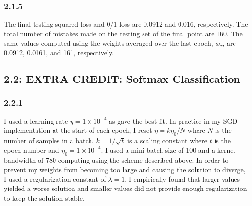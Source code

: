 \documentclass[12pt]{amsart}
\begin{document}
\subsubsection*{2.1.5}
The final testing squared loss and 0/1 loss are 0.0912 and 0.016, respectively.  The total number of mistakes made on the testing set of the final point are 160.  The same values computed using the weights averaged over the last epoch, $\bar{w}_{\tau}$, are 0.0912, 0.0161, and 161, respectively.

\subsection*{2.2: EXTRA CREDIT: Softmax Classification}

\subsubsection*{2.2.1}

I used a learning rate $\eta = 1 \times 10^{-4}$ as gave the best fit.  In practice in my SGD implementation at the start of each epoch, I reset $\eta = k\eta_0/N$ where $N$ is the number of samples in a batch, $k = 1/\sqrt{t}$ is a scaling constant where $t$ is the epoch number and $\eta_0 = 1 \times 10^{-4}$.  I used a mini-batch size of 100 and a kernel bandwidth of 780 computing using the scheme described above.  In order to prevent my weights from becoming too large and causing the solution to diverge, I used a regularization constant of $\lambda = 1$.  I empirically found that larger values yielded a worse solution and smaller values did not provide enough regularization to keep the solution stable.
\end{document}
